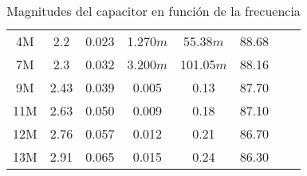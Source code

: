 \begin{center}
\begin{table}[H]
\begin{tabular}{ c c c c c c c c }
			4M   & 2.2  & 0.023 & 1.270$m$   & 55.38$m$  & 88.68 \\
			7M   & 2.3  & 0.032 & 3.200$m$    & 101.05$m$ & 88.16 \\
			9M   & 2.43 & 0.039 & 0.005   & 0.13  & 87.70 \\
			11M  & 2.63 & 0.050 & 0.009   & 0.18   & 87.10 \\
			12M  & 2.76 & 0.057 & 0.012   & 0.21   & 86.70 \\
			13M  & 2.91 & 0.065 & 0.015   & 0.24   & 86.30 \\
            \hline 
        \end{tabular}
        \caption{Magnitudes del capacitor en función de la frecuencia}
        \label{table:Rta_en_frecuencia_capacitor}
    \end{table}
\end{center}
